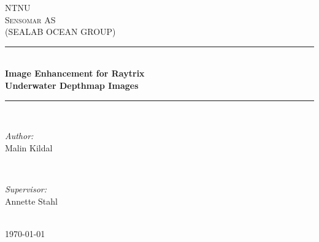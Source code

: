\documentclass[11pt]{article}
\begin{document}
\begin{titlepage}

\newcommand{\HRule}{\rule{\linewidth}{0.5mm}}
\center

\textsc{\LARGE NTNU}\\[1.0cm]
\textsc{\LARGE Sensomar AS \\[0.3cm]
(SEALAB OCEAN GROUP)}\\[3.0cm]

\HRule \\[0.5cm]
{ \huge \bfseries Image Enhancement for Raytrix \\[0.2cm]
Underwater Depthmap Images}\\[0.5cm]
\HRule \\[3.0cm]

\begin{minipage}{0.4\textwidth}
\begin{flushleft} \large
\emph{Author:}\\
Malin Kildal
\end{flushleft}
\end{minipage}
~
\begin{minipage}{0.4\textwidth}
\begin{flushright} \large
\emph{Supervisor:} \\
Annette Stahl
\end{flushright}
\end{minipage}\\[5cm]

{\large \today}\\[1cm]

\end{titlepage}



\clearpage


\clearpage

\listoffigures
{}
\clearpage

\tableofcontents
\clearpage


\clearpage


\clearpage


\clearpage


\clearpage


\clearpage


\clearpage


\clearpage


\clearpage



\clearpage


\clearpage
\end{document}
